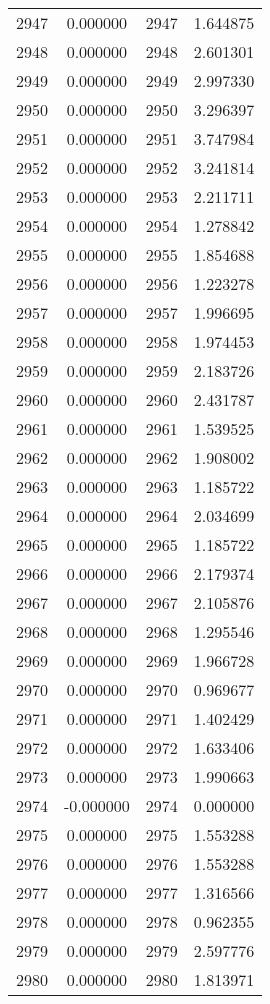 \documentclass[12pt]{article}
\begin{document}
\begin{longtable}{@{}cccc@{}}
2947 & 0.000000 & 2947 & 1.644875 \\
2948 & 0.000000 & 2948 & 2.601301 \\
2949 & 0.000000 & 2949 & 2.997330 \\
2950 & 0.000000 & 2950 & 3.296397 \\
2951 & 0.000000 & 2951 & 3.747984 \\
2952 & 0.000000 & 2952 & 3.241814 \\
2953 & 0.000000 & 2953 & 2.211711 \\
2954 & 0.000000 & 2954 & 1.278842 \\
2955 & 0.000000 & 2955 & 1.854688 \\
2956 & 0.000000 & 2956 & 1.223278 \\
2957 & 0.000000 & 2957 & 1.996695 \\
2958 & 0.000000 & 2958 & 1.974453 \\
2959 & 0.000000 & 2959 & 2.183726 \\
2960 & 0.000000 & 2960 & 2.431787 \\
2961 & 0.000000 & 2961 & 1.539525 \\
2962 & 0.000000 & 2962 & 1.908002 \\
2963 & 0.000000 & 2963 & 1.185722 \\
2964 & 0.000000 & 2964 & 2.034699 \\
2965 & 0.000000 & 2965 & 1.185722 \\
2966 & 0.000000 & 2966 & 2.179374 \\
2967 & 0.000000 & 2967 & 2.105876 \\
2968 & 0.000000 & 2968 & 1.295546 \\
2969 & 0.000000 & 2969 & 1.966728 \\
2970 & 0.000000 & 2970 & 0.969677 \\
2971 & 0.000000 & 2971 & 1.402429 \\
2972 & 0.000000 & 2972 & 1.633406 \\
2973 & 0.000000 & 2973 & 1.990663 \\
2974 & -0.000000 & 2974 & 0.000000 \\
2975 & 0.000000 & 2975 & 1.553288 \\
2976 & 0.000000 & 2976 & 1.553288 \\
2977 & 0.000000 & 2977 & 1.316566 \\
2978 & 0.000000 & 2978 & 0.962355 \\
2979 & 0.000000 & 2979 & 2.597776 \\
2980 & 0.000000 & 2980 & 1.813971 \\

\end{longtable}
\end{document}
